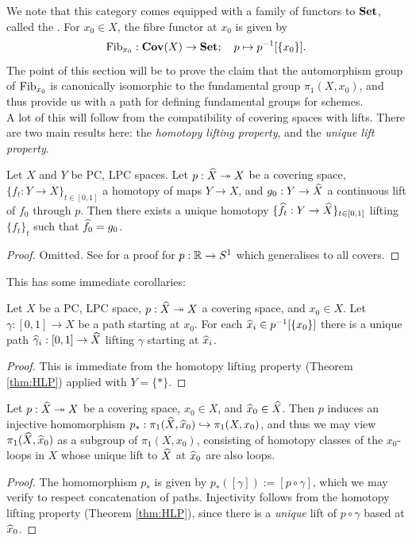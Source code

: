 We note that this category comes equipped with a family of functors to $\mathbf{Set}$, called the . For $x_0 \in X$, the fibre functor at $x_0$ is given by 
\[
	\mathrm{Fib}_{x_0} : \mathbf{Cov}(X) \to \mathbf{Set};\quad p \mapsto p^{-1}[\{x_0\}].
\]
The point of this section will be to prove the claim that the automorphism group of $\mathrm{Fib}_{x_0}$ is canonically isomorphic to the fundamental group $\pi_1(X, x_0)$, and thus provide us with a path for defining fundamental groups for schemes.\\

A lot of this will follow from the compatibility of covering spaces with lifts. There are two main results here: the \emph{homotopy lifting property}, and the \emph{unique lift property}.

\begin{thm}
	\label{thm:HLP}
	Let $X$ and $Y$ be PC, LPC spaces. Let $p: \widehat{X} \twoheadrightarrow X$ be a covering space, $\{f_t : Y \to X\}_{t \in [0,1]}$ a homotopy of maps $Y \to X$, and $g_0 : Y \to \widehat{X}$ a continuous lift of $f_0$ through $p$. Then there exists a unique homotopy $\{\widehat{f}_t : Y \to \widehat{X}\}_{t \in [0,1]}$ lifting $\{f_t\}_t$ such that $\widehat{f}_0 = g_0$.
\end{thm}
\begin{proof}
	Omitted. See \cite[Thm.~1.7]{Hatcher2001-gv} for a proof for $p: \mathbb{R} \to S^1$ which generalises to all covers.
\end{proof}

This has some immediate corollaries:

\begin{cor}
	\label{cor:unique_path_lifts}
	Let $X$ be a PC, LPC space, $p:\widehat{X} \twoheadrightarrow X$ a covering space, and $x_0 \in X$. Let $\gamma : [0,1] \to X$ be a path starting at $x_0$. For each $\widehat{x}_i \in p^{-1}[\{x_0\}]$ there is a unique path $\widehat{\gamma}_i : [0,1] \to \widehat{X}$ lifting $\gamma$ starting at $\widehat{x}_i$.
\end{cor}
\begin{proof}
	This is immediate from the homotopy lifting property (Theorem \ref{thm:HLP}) applied with $Y = \{\ast\}$.
\end{proof}

\begin{cor}
	\label{cor:induced_maps_of_covers}
	Let $p : \widehat{X} \twoheadrightarrow X$ be a covering space, $x_0 \in X$, and $\widehat{x}_0 \in \widehat{X}$. Then $p$ induces an injective homomorphism $p_* : \pi_1(\widehat{X}, \widehat{x}_0) \hookrightarrow \pi_1(X,x_0)$, and thus we may view $\pi_1(\widehat{X}, \widehat{x}_0)$ as a subgroup of $\pi_1(X,x_0)$, consisting of homotopy classes of the $x_0$-loops in $X$ whose unique lift to $\widehat{X}$ at $\widehat{x}_0$ are also loops.
\end{cor}
\begin{proof}
	The homomorphism $p_*$ is given by $p_*([\gamma]) := [p \circ \gamma]$, which we may verify to respect concatenation of paths. Injectivity follows from the homotopy lifting property (Theorem \ref{thm:HLP}), since there is a \emph{unique} lift of $p \circ \gamma$ based at $\widehat{x}_0$.
\end{proof}

